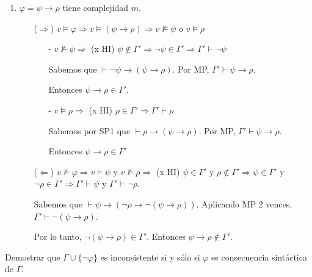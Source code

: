 \begin{questions}
\begin{solution}
\begin{enumerate}[\quad]
\begin{enumerate}
    \item $\varphi = \psi \rightarrow \rho$ tiene complejidad $m$. 
    
    \begin{itemize}
     \item[($\Rightarrow$)] $v\vDash\varphi \Rightarrow v\vDash (\psi \rightarrow \rho) \Rightarrow v\nvDash\psi$ o $v\vDash\rho$
     
     \begin{itemize}
      \item[-] $v\nvDash\psi \Rightarrow$ (x HI) $\psi\notin\Gamma' \Rightarrow \neg\psi\in\Gamma' \Rightarrow \Gamma'\vdash\neg\psi$
      
	Sabemos que $\vdash\neg\psi\rightarrow(\psi\rightarrow\rho)$. Por MP, $\Gamma'\vdash\psi\rightarrow\rho$. 
	
	Entonces $\psi\rightarrow\rho\in\Gamma'$.
      
      \item[-] $v\vDash\rho \Rightarrow$ (x HI) $\rho\in\Gamma' \Rightarrow \Gamma'\vdash\rho$ 
	
	Sabemos por SP1 que $\vdash\rho\rightarrow(\psi\rightarrow\rho)$. Por MP, $\Gamma'\vdash\psi\rightarrow\rho$.
	
	Entonces $\psi\rightarrow\rho\in\Gamma'$
      
     \end{itemize}
     
     \item[($\Leftarrow$)] $v\nvDash\varphi \Rightarrow v\vDash\psi$ y $v\nvDash\rho \Rightarrow$ (x HI) $\psi\in\Gamma'$ y $\rho\notin\Gamma' \Rightarrow \psi\in\Gamma'$ y $\neg\rho\in\Gamma' \Rightarrow \Gamma'\vdash\psi$ y $\Gamma'\vdash\neg\rho$.
     
     Sabemos que $\vdash\psi\rightarrow(\neg\rho\rightarrow\neg(\psi\rightarrow\rho))$. Aplicando MP 2 vences, $\Gamma'\vdash\neg(\psi\rightarrow\rho)$. 
     
     Por lo tanto, $\neg(\psi\rightarrow\rho)\in\Gamma'$. Entonces $\psi\rightarrow\rho\notin\Gamma'$.
     
    \end{itemize}

    
  \end{enumerate}


 \end{enumerate}

\end{solution}

\question Demostrar que $\Gamma \cup \{\neg\varphi\}$ es inconsistente si y s\'olo si $\varphi$ es consecuencia sint\'actica de $\Gamma$.


\end{questions}
